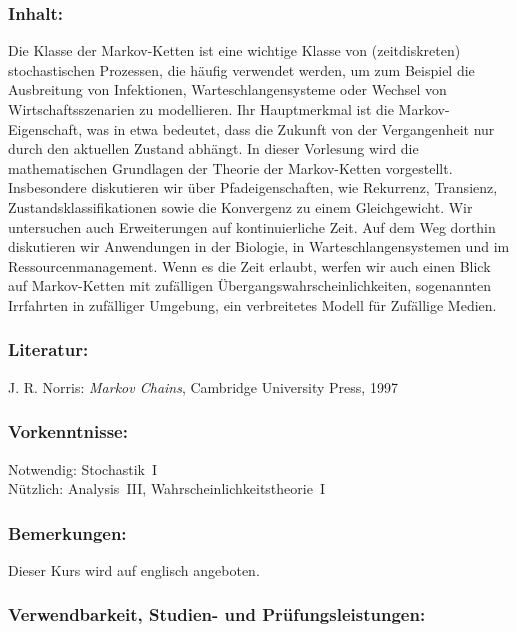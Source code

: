 \documentclass[a4paper,10pt]{article}
\begin{document}
\subsubsection*{\large
    Inhalt:
}
Die Klasse der Markov-Ketten ist eine wichtige Klasse von (zeitdiskreten) stochastischen Prozessen, die häufig verwendet werden, um zum Beispiel die Ausbreitung von Infektionen, Warteschlangensysteme oder Wechsel von Wirtschaftsszenarien zu modellieren. Ihr Hauptmerkmal ist die Markov-Eigenschaft, was in etwa bedeutet, dass die Zukunft von der Vergangenheit nur durch den aktuellen Zustand abhängt. In dieser Vorlesung wird die mathematischen Grundlagen der Theorie der Markov-Ketten vorgestellt. Insbesondere diskutieren wir über Pfadeigenschaften, wie Rekurrenz, Transienz, Zustandsklassifikationen sowie die Konvergenz zu einem Gleichgewicht. Wir untersuchen auch Erweiterungen auf kontinuierliche Zeit. Auf dem Weg dorthin diskutieren wir Anwendungen in der Biologie, in Warteschlangensystemen und  im Ressourcenmanagement. Wenn es die Zeit erlaubt, werfen wir auch einen Blick auf Markov-Ketten mit zufälligen Übergangswahrscheinlichkeiten, sogenannten Irrfahrten in zufälliger Umgebung, ein verbreitetes Modell für Zufällige Medien. 
\subsubsection*{\large
    Literatur:
}
J. R. Norris: \emph{Markov Chains}, Cambridge University Press, 1997
\subsubsection*{\large
    Vorkenntnisse:
}
Notwendig: Stochastik~I \\
Nützlich: Analysis~III,  Wahrscheinlichkeitstheorie~I
\subsubsection*{\large
    Bemerkungen:
}
Dieser Kurs wird auf englisch angeboten.
\cleardoublepage
\subsubsection*{\large
    Verwendbarkeit, Studien- und Prüfungsleistungen:
}
\end{document}
